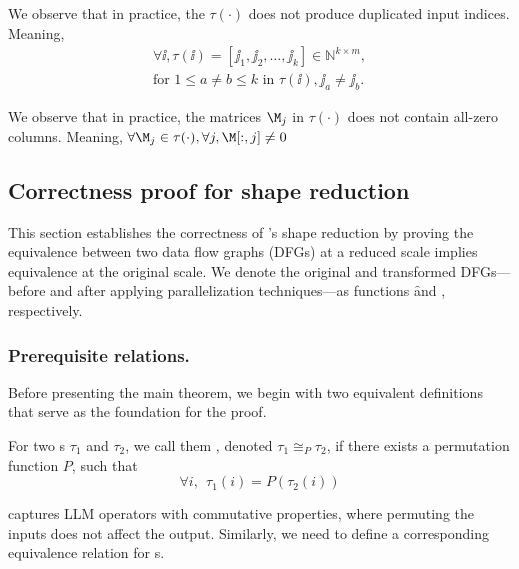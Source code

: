 \begin{fact}
We observe that in practice,
the \depmap $\tau(\cdot)$ does not produce duplicated input indices.
Meaning,
\begin{align*}
    \forall \ii, \tau(\ii) = [\jj_1, \jj_2, \dots, \jj_k] \in \mathbb{N}^{k \times m},\\
    \text{for } 1 \le a \neq b \le k \text{ in }\tau(\ii), \jj_a \neq \jj_b.
\end{align*}
    \label{fact:uniqueindx}
\end{fact}

\begin{fact}
We observe that in practice,
the matrices $\M_j$ in \depmap $\tau(\cdot)$ does not contain all-zero columns.
    Meaning, $\forall \M_j \in \tau(\cdot), \forall j, \M[:,j] \neq 0$
    \label{fact:nonzerocol}
\end{fact}



\subsection{Correctness proof for shape reduction}

This section establishes the correctness of \sys's shape reduction
by proving the equivalence between two data flow graphs (DFGs)
at a reduced scale %
implies equivalence
at the original scale. %
We denote the original and transformed DFGs---before and after applying parallelization techniques---as functions
\f and \g, respectively.

\subsubsection{Prerequisite relations.}
Before presenting the main theorem, we begin with two equivalent definitions
that serve as the foundation for the proof.


\begin{definition}[\CF{\depeq}]
For two \depmap{}s $\tau_1$ and $\tau_2$,
we call them \depeq, denoted $\tau_1 \cong_P \tau_2$,
if there exists a permutation function $P$,
such that
\[
\forall i, \ \ \tau_1(i) = P(\tau_2(i))
\]
    \label{def:depeq}
\end{definition}

\CF{\depeq} captures LLM operators with commutative
properties, where permuting the inputs does not affect the output. Similarly,
we need to define a corresponding equivalence relation for \kfunc{}s.

